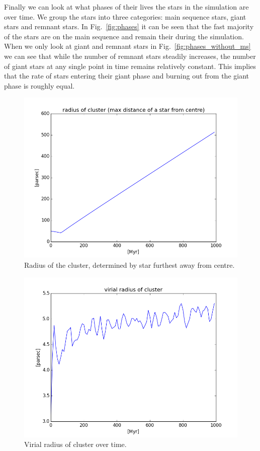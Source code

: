 \documentclass{aa}
\begin{document}
Finally we can look at what phases of their lives the stars in the simulation are over time. We group the stars into three categories: main sequence stars, giant stars and remnant stars. In Fig.~\ref{fig:phases} it can be seen that the fast majority of the stars are on the main sequence and remain their during the simulation. When we only look at giant and remnant stars in Fig.~\ref{fig:phases_without_ms} we can see that while the number of remnant stars steadily increases, the number of giant stars at any single point in time remains relatively constant. This implies that the rate of stars entering their giant phase and burning out from the giant phase is roughly equal.
\begin{figure}
    \centering
    \includegraphics[width=\hsize]{img/cluster_max_radius.png}
    \caption{Radius of the cluster, determined by star furthest away from centre.}\label{fig:max_radius}
\end{figure}

\begin{figure}
    \centering
    \includegraphics[width=\hsize]{img/cluster_virial_radius.png}
    \caption{Virial radius of cluster over time.}\label{fig:virial_radius}
\end{figure}
\end{document}
